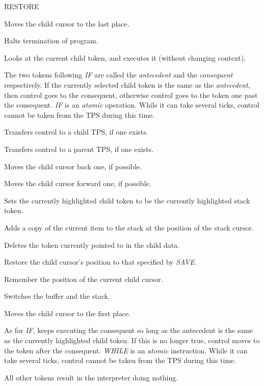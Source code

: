 \documentclass{article}
\begin{document}
\begin{labeling}{RESTORE}


\item [BOTTOM] 
Moves the child cursor to the last place.

\item [END]
Halts termination of program.

\item [EXEC]
Looks at the current child token, and executes it (without changing context).

\item [IF]
The two tokens following \emph{IF} are called the \emph{antecedent} and the \emph{consequent} respectively.  If the currently selected child token is the same as the \emph{antecedent}, then control goes to the consequent, otherwise control goes to the token one past the consequent.  \emph{IF} is an \emph{atomic} operation. While it can take several ticks, control cannot be taken from the TPS during this time.

\item [IN]
Transfers control to a child TPS, if one exists.

\item [OUT]
Transfers control to a parent TPS, if one exists.

\item [PREV] 
Moves the child cursor back one, if possible.

\item [NEXT] 
Moves the child cursor forward one, if possible.

\item [POP] 
Sets the currently highlighted child token to be the currently highlighted stack token.

\item [PUSH] 
Adds a copy of the current item to the stack at the position of the stack cursor.

\item [REMOVE]
Deletes the token currently pointed to in the child data.

\item [RESTORE]
Restore the child cursor's position to that specified by \emph{SAVE}.

\item [SAVE]
Remember the position of the current child cursor.

\item [SWITCH]
Switches the buffer and the stack.

\item [TOP] 
Moves the child cursor to the first place.

\item [WHILE]
As for \emph{IF}, keeps executing the consequent so long as the antecedent is the same as the currently highlighted child token. If this is no longer true, control moves to the token after the consequent.  \emph{WHILE} is an \emph{atomic} instruction. While it can take several ticks, control cannot be taken from the TPS during this time.


\item
All other tokens result in the interpreter doing nothing.

\end{labeling}
\end{document}
